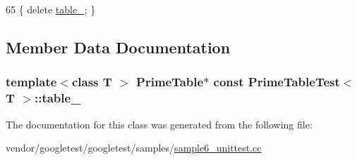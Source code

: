 \begin{DoxyCode}
65 \{ \textcolor{keyword}{delete} \hyperlink{classPrimeTableTest_a86da90fc6d5cef6386d0cd8fb52b4046}{table\_}; \}
\end{DoxyCode}


\subsection{Member Data Documentation}
\subsubsection[{\texorpdfstring{table\+\_\+}{table_}}]{\setlength{\rightskip}{0pt plus 5cm}template$<$class T $>$ {\bf Prime\+Table}$\ast$ const {\bf Prime\+Table\+Test}$<$ T $>$\+::table\+\_\+\hspace{0.3cm}{\ttfamily [protected]}}\hypertarget{classPrimeTableTest_a86da90fc6d5cef6386d0cd8fb52b4046}{}\label{classPrimeTableTest_a86da90fc6d5cef6386d0cd8fb52b4046}


The documentation for this class was generated from the following file\+:\begin{DoxyCompactItemize}
\item 
vendor/googletest/googletest/samples/\hyperlink{sample6__unittest_8cc}{sample6\+\_\+unittest.\+cc}\end{DoxyCompactItemize}
